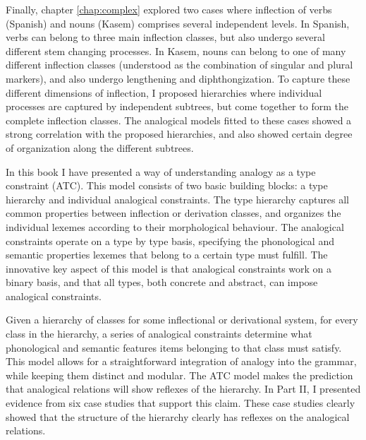 Finally, chapter \ref{chap:complex} explored two cases where inflection of verbs (Spanish) and nouns (Kasem) comprises several independent levels.
In Spanish, verbs can belong to three main inflection classes, but also undergo several different stem changing processes.
In Kasem, nouns can belong to one of many different inflection classes (understood as the combination of singular and plural markers), and also undergo lengthening and diphthongization.
To capture these different dimensions of inflection, I proposed hierarchies where individual processes are captured by independent subtrees, but come together to form the complete inflection classes.
The analogical models fitted to these cases showed a strong correlation with the proposed hierarchies, and also showed certain degree of organization along the different subtrees.

In this book I have presented a way of understanding analogy as a type constraint (ATC).
This model consists of two basic building blocks: a type hierarchy and individual analogical constraints.
The type hierarchy captures all common properties between inflection or derivation classes, and organizes the individual lexemes according to their morphological behaviour.
The analogical constraints operate on a type by type basis, specifying the phonological and semantic properties lexemes that belong to a certain type must fulfill.
The innovative key aspect of this model is that analogical constraints work on a binary basis, and that all types, both concrete and abstract, can impose analogical constraints.

Given a hierarchy of classes for some inflectional or derivational system, for every class in the hierarchy, a series of analogical constraints determine what phonological and semantic features items belonging to that class must satisfy.
This model allows for a straightforward integration of analogy into the grammar, while keeping them distinct and modular.
The ATC model makes the prediction that analogical relations will show reflexes of the hierarchy. In Part II, I presented evidence from six case studies that support this claim.
These case studies clearly showed that the structure of the hierarchy clearly has reflexes on the analogical relations.

